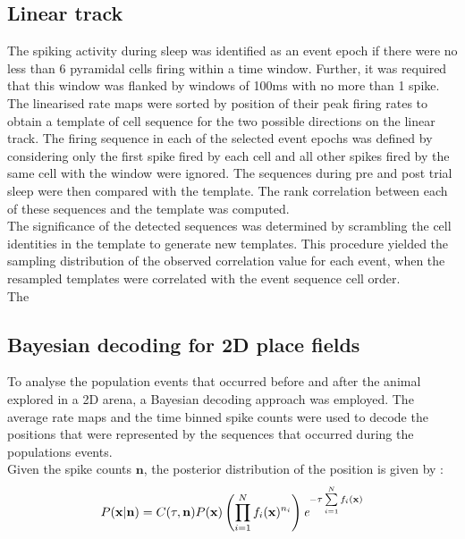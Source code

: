 \subsection{Linear track}
The spiking activity during sleep was identified as an event epoch if there were no less than 6 pyramidal cells firing within a time window. Further, it was required that this window was flanked by windows of 100ms with no more than 1 spike. The linearised rate maps were sorted by position of their peak firing rates to obtain a template of cell sequence for the two possible directions on the linear track. The firing sequence in each of the selected event epochs was defined by considering only the first spike fired by each cell and all other spikes fired by the same cell with the window were ignored. The sequences during pre and post trial sleep were then compared with the template. The rank correlation between each of these sequences and the template was computed. \\ 
The significance of the detected sequences was determined by scrambling the cell identities in the template to generate new templates. This procedure yielded the sampling distribution of the observed correlation value for each event, when the resampled templates were correlated with the event sequence cell order. \\
The 

\subsection{Bayesian decoding for 2D place fields}
To analyse the population events that occurred before and after the animal explored in a 2D arena, a Bayesian decoding approach was employed. The average rate maps and the time binned spike counts were used to decode the positions that were represented by the sequences that occurred during the populations events. \\
Given the spike counts $\mathbf{n}$, the posterior distribution of the position is given by : 
\[ 
P( \mathbf{x} | \mathbf{n}) = C(\tau, \mathbf{n}) P(\mathbf{x}) \left(\prod_{i = 1}^{N} f_{i}(\mathbf{x})^{n_i} \right) \emph{e}^{-\tau \sum\limits_{i = 1}^{N} f_{i}(\mathbf{x}) }
 \]


	
